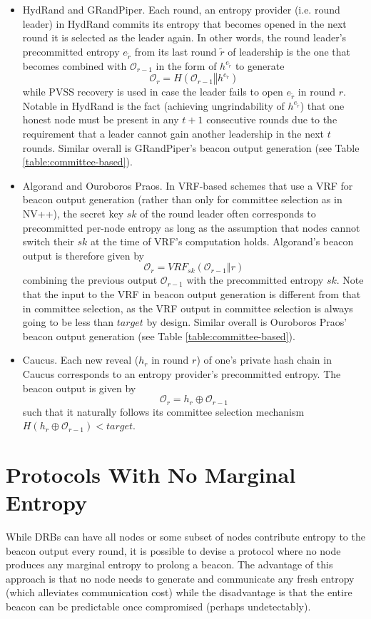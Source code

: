 \documentclass[conference]{IEEEtran}
\theoremstyle{definition}
\theoremstyle{remark}
\begin{document}
\begin{itemize}
\item HydRand and GRandPiper. Each round, an entropy provider (i.e. round leader) in HydRand commits its entropy that becomes opened in the next round it is selected as the leader again. In other words, the round leader's precommitted entropy $e_{\tilde{r}}$ from its last round $\tilde{r}$ of leadership is the one that becomes combined with $\mathcal{O}_{r - 1}$ in the form of $h^{e_{\tilde{r}}}$ to generate
\[
\mathcal{O}_r = H(\mathcal{O}_{r - 1} \mathbin\Vert h^{e_{\tilde{r}}})
\]
while PVSS recovery is used in case the leader fails to open $e_{\tilde{r}}$ in round $r$. Notable in HydRand is the fact (achieving ungrindability of $h^{e_{\tilde{r}}}$) that one honest node must be present in any $t + 1$ consecutive rounds due to the requirement that a leader cannot gain another leadership in the next $t$ rounds. Similar overall is GRandPiper's beacon output generation (see Table \ref{table:committee-based}).
\item Algorand and Ouroboros Praos. In VRF-based schemes that use a VRF for beacon output generation (rather than only for committee selection as in NV++), the secret key $sk$ of the round leader often corresponds to precommitted per-node entropy as long as the assumption that nodes cannot switch their $sk$ at the time of VRF's computation holds. Algorand's beacon output is therefore given by
\[
\mathcal{O}_r = VRF_{sk}(\mathcal{O}_{r - 1} \mathbin\Vert r)
\]
combining the previous output $\mathcal{O}_{r - 1}$ with the precommitted entropy $sk$. Note that the input to the VRF in beacon output generation is different from that in committee selection, as the VRF output in committee selection is always going to be less than $target$ by design. Similar overall is Ouroboros Praos' beacon output generation (see Table \ref{table:committee-based}).
\item Caucus. Each new reveal ($h_r$ in round $r$) of one's private hash chain in Caucus corresponds to an entropy provider's precommitted entropy. The beacon output is given by
\[
\mathcal{O}_r = h_r \oplus \mathcal{O}_{r - 1}
\]
such that it naturally follows its committee selection mechanism $H(h_r \oplus \mathcal{O}_{r - 1}) < target$.
\end{itemize}

\section{Protocols With No Marginal Entropy}
\label{section:dvrf}
While DRBs can have all nodes or some subset of nodes contribute entropy to the beacon output every round, it is possible to devise a protocol where no node produces any marginal entropy to prolong a beacon. The advantage of this approach is that no node needs to generate and communicate any fresh entropy (which alleviates communication cost) while the disadvantage is that the entire beacon can be predictable once compromised (perhaps undetectably).
\end{document}
